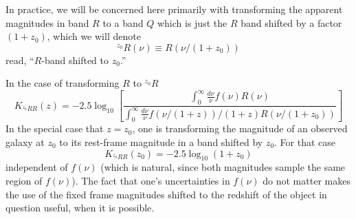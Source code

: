 \documentclass[10pt,preprint]{aastex}
\newcommand{\band}[2]{\ensuremath{^{{#1}}\!{#2}}}
\begin{document}
In practice, we will be concerned here primarily with transforming the
apparent magnitudes in band $R$ to a band $Q$ which is just the $R$
band shifted by a factor $(1+z_0)$, which we will denote
\begin{equation}
\band{z_0}{R}(\nu) \equiv R(\nu/(1+z_0))  
\end{equation}
read, ``$R$-band shifted to $z_0$.''  

In the case of transforming $R$ to $\band{z_0}{R}$
\begin{equation}
K_{\band{z_0}{R}R}(z) = -2.5 \log_{10} \left[
\frac{
\int_0^{\infty} \frac{d\nu}{\nu} f(\nu) R(\nu)
}{
\int_0^{\infty} \frac{d\nu}{\nu} f(\nu/(1+z))/(1+z) R(\nu/(1+z_0))
}
\right]
\end{equation}
In the special case that $z=z_0$, one is transforming the magnitude of
an observed galaxy at $z_0$ to its rest-frame magnitude in a band
shifted by $z_0$. For that case
\begin{equation}
K_{\band{z_0}{R}R}(z_0) = -2.5 \log_{10} (1+z_0)
\end{equation}
independent of $f(\nu)$ (which is natural, since both magnitudes
sample the same region of $f(\nu)$). The fact that one's uncertainties
in $f(\nu)$ do not matter makes the use of the fixed frame magnitudes
shifted to the redshift of the object in question useful, when it is
possible.

\end{document}

